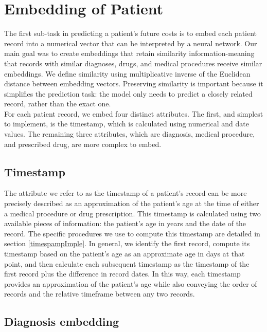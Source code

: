 
\section{Embedding of Patient}
\label{embedding}

The first sub-task in predicting a patient’s future costs is to embed each patient record into a numerical vector that can be interpreted by a neural network. Our main goal was to create embeddings that retain similarity information-meaning that records with similar diagnoses, drugs, and medical procedures receive similar embeddings. We define similarity using multiplicative inverse of the Euclidean distance between embedding vectors. Preserving similarity is important because it simplifies the prediction task: the model only needs to predict a closely related record, rather than the exact one.
\\

For each patient record, we embed four distinct attributes. The first, and simplest to implement, is the timestamp, which is calculated using numerical and date values. The remaining three attributes, which are diagnosis, medical procedure, and prescribed drug, are more complex to embed.

\subsection{Timestamp}

The attribute we refer to as the timestamp of a patient’s record can be more precisely described as an approximation of the patient’s age at the time of either a medical procedure or drug prescription. This timestamp is calculated using two available pieces of information: the patient’s age in years and the date of the record. The specific procedures we use to compute this timestamp are detailed in section \ref{timespampImple}. In general, we identify the first record, compute its timestamp based on the patient’s age as an approximate age in days at that point, and then calculate each subsequent timestamp as the timestamp of the first record plus the difference in record dates. In this way, each timestamp provides an approximation of the patient’s age while also conveying the order of records and the relative timeframe between any two records.

\subsection{Diagnosis embedding}
\label{diagEmb}

